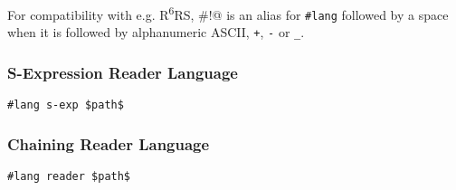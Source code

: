 
For compatibility with e.g. R\textsuperscript{6}RS, \lstinline@#!@ is an alias for \lstinline!#lang! followed by a space when it is followed by alphanumeric ASCII, \lstinline!+!, \lstinline!-! or \lstinline!_!. 





\subsubsection{S-Expression Reader Language}

\begin{lstlisting}
#lang s-exp $path$
\end{lstlisting}





\subsubsection{Chaining Reader Language}

\begin{lstlisting}
#lang reader $path$
\end{lstlisting}






